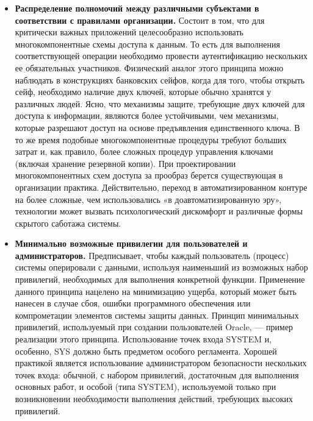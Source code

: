 \begin{itemize}
	\item \textbf{Распределение полномочий между различными субъектами в соответствии с правилами организации.}
        Состоит в том, что для критически важных приложений целесообразно использовать многокомпонентные
        схемы доступа к данным. То есть для выполнения соответствующей операции необходимо провести
        аутентификацию нескольких ее обязательных участников. Физический аналог этого принципа можно
        наблюдать в конструкциях банковских сейфов, когда для того, чтобы открыть сейф, необходимо наличие
        двух ключей, которые обычно хранятся у различных людей. Ясно, что механизмы защите, требующие двух
        ключей для доступа к информации, являются более устойчивыми, чем механизмы, которые разрешают доступ
        на основе предъявления единственного ключа. В то же время подобные многокомпонентные процедуры требуют
        больших затрат и, как правило, более сложных процедур управления ключами (включая хранение резервной
        копии). При проектировании многокомпонентных схем доступа за прообраз берется существующая в
        организации практика. Действительно, переход в автоматизированном контуре на более сложные,
        чем использовались «в доавтоматизированную эру», технологии может вызвать психологический дискомфорт
        и различные формы скрытого саботажа системы.

    \item \textbf{Минимально возможные привилегии для пользователей и администраторов.}
        Предписывает, чтобы каждый пользователь (процесс) системы оперировали с данными, используя наименьший
        из возможных набор привилегий, необходимых для выполнения конкретной функции. Применение данного
        принципа нацелено на минимизацию ущерба, который может быть нанесен в случае сбоя, ошибки программного
        обеспечения или компрометации элементов системы защиты данных. Принцип минимальных привилегий,
        используемый при создании пользователей Oracle, — пример реализации этого принципа. Использование
        точек входа SYSTEM и, особенно, SYS должно быть предметом особого регламента. Хорошей практикой
        является использование администратором безопасности нескольких точек входа: обычной, с набором
        привилегий, достаточным для выполнения основных работ, и особой (типа SYSTEM), используемой только
        при возникновении необходимости выполнения действий, требующих высоких привилегий.


\end{itemize}
